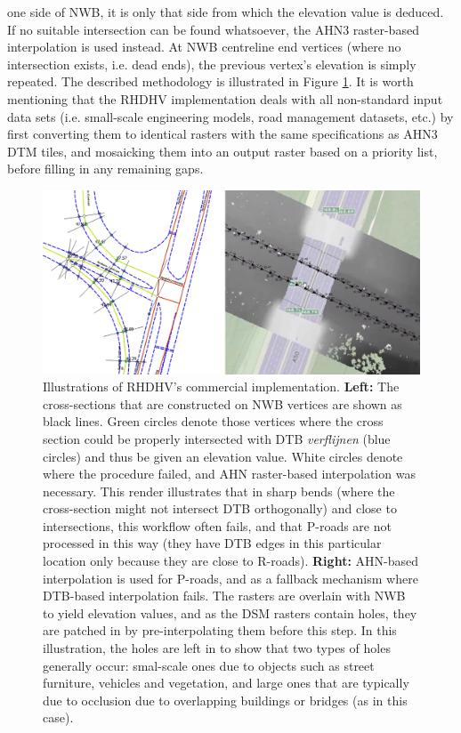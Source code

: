 one side of NWB, it is only that side from which the elevation value is deduced. If no suitable intersection can be found whatsoever, the AHN3 raster-based interpolation is used instead. At NWB centreline end vertices (where no intersection exists, i.e. dead ends), the previous vertex’s elevation is simply repeated. The described methodology is illustrated in Figure \ref{fig:rhdhv}. It is worth mentioning that the RHDHV implementation deals with all non-standard input data sets (i.e. small-scale engineering models, road management datasets, etc.) by first converting them to identical rasters with the same specifications as AHN3 DTM tiles, and mosaicking them into an output raster based on a priority list, before filling in any remaining gaps.

\begin{figure}[h]
    \centering
    \includegraphics[width=\linewidth]{p2/figs/rhdhv_combined.png} 
    \caption{Illustrations of RHDHV's commercial implementation. \textbf{Left:} The cross-sections that are constructed on NWB vertices are shown as black lines. Green circles denote those vertices where the cross section could be properly intersected with DTB \textit{verflijnen} (blue circles) and thus be given an elevation value. White circles denote where the procedure failed, and AHN raster-based interpolation was necessary. This render illustrates that in sharp bends (where the cross-section might not intersect DTB orthogonally) and close to intersections, this workflow often fails, and that P-roads are not processed in this way (they have DTB edges in this particular location only because they are close to R-roads). \textbf{Right:} AHN-based interpolation is used for P-roads, and as a fallback mechanism where DTB-based interpolation fails. The rasters are overlain with NWB to yield elevation values, and as the DSM rasters contain holes, they are patched in by pre-interpolating them before this step. In this illustration, the holes are left in to show that two types of holes generally occur: smal-scale ones due to objects such as street furniture, vehicles and vegetation, and large ones that are typically due to occlusion due to overlapping buildings or bridges (as in this case).}
    \label{fig:rhdhv}
\end{figure}

